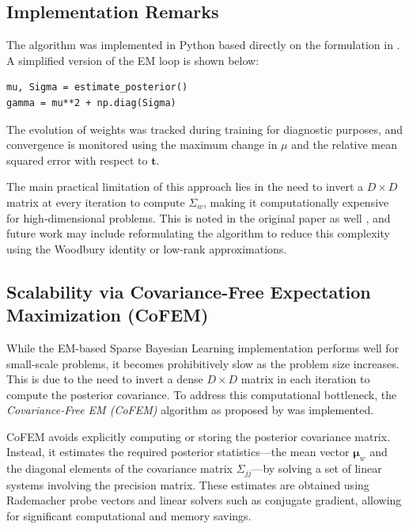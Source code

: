 \documentclass{article}
\begin{document}
\subsection{Implementation Remarks}

The algorithm was implemented in Python based directly on the formulation in \citet{wipf2004sparse}. A simplified version of the EM loop is shown below:

\begin{verbatim}
mu, Sigma = estimate_posterior()
gamma = mu**2 + np.diag(Sigma)
\end{verbatim}

The evolution of weights was tracked during training for diagnostic purposes, and convergence is monitored using the maximum change in $\mu$ and the relative mean squared error with respect to $\mathbf{t}$.

The main practical limitation of this approach lies in the need to invert a $D \times D$ matrix at every iteration to compute $\Sigma_w$, making it computationally expensive for high-dimensional problems. This is noted in the original paper as well \cite[p.~2155]{wipf2004sparse}, and future work may include reformulating the algorithm to reduce this complexity using the Woodbury identity or low-rank approximations.

\subsection{Scalability via Covariance-Free Expectation Maximization (CoFEM)}

While the EM-based Sparse Bayesian Learning implementation performs well for small-scale problems, it becomes prohibitively slow as the problem size increases. This is due to the need to invert a dense $ D \times D $ matrix in each iteration to compute the posterior covariance. To address this computational bottleneck, the \emph{Covariance-Free EM (CoFEM)} algorithm as proposed by \citet{lin2022covariance} was implemented.

CoFEM avoids explicitly computing or storing the posterior covariance matrix. Instead, it estimates the required posterior statistics—the mean vector $ \boldsymbol{\mu}_w $ and the diagonal elements of the covariance matrix $ \Sigma_{jj} $—by solving a set of linear systems involving the precision matrix. These estimates are obtained using Rademacher probe vectors and linear solvers such as conjugate gradient, allowing for significant computational and memory savings.
\end{document}
